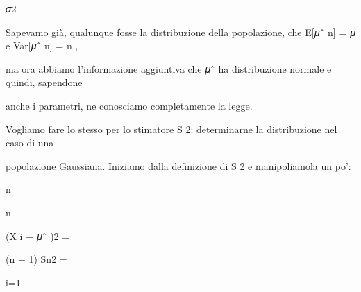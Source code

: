 \documentclass[a4paper,portrait,12pt]{article}
\begin{document}
\begin{flushleft}
𝜎2
\end{flushleft}





\begin{flushleft}
Sapevamo gi\`{a}, qualunque fosse la distribuzione della popolazione, che E[𝜇ˆ n] = 𝜇 e Var[𝜇ˆ n] = n ,
\end{flushleft}


\begin{flushleft}
ma ora abbiamo l'informazione aggiuntiva che 𝜇ˆ ha distribuzione normale e quindi, sapendone
\end{flushleft}


\begin{flushleft}
anche i parametri, ne conosciamo completamente la legge.
\end{flushleft}


\begin{flushleft}
Vogliamo fare lo stesso per lo stimatore S 2: determinarne la distribuzione nel caso di una
\end{flushleft}


\begin{flushleft}
popolazione Gaussiana. Iniziamo dalla definizione di S 2 e manipoliamola un po':
\end{flushleft}


\begin{flushleft}
n
\end{flushleft}





\begin{flushleft}
n
\end{flushleft}





\begin{flushleft}
(X i $-$ 𝜇ˆ )2 =
\end{flushleft}





\begin{flushleft}
(n $-$ 1) Sn2 =
\end{flushleft}


\begin{flushleft}
i=1
\end{flushleft}
\end{document}

